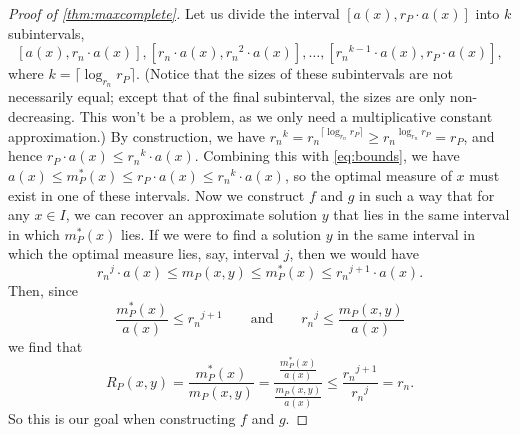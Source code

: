 \documentclass[]{article}
\theoremstyle{plain}
\theoremstyle{definition}
\newcommand{\ceil}[1]{\lceil{#1}\rceil}
\begin{document}
\begin{proof}[Proof of \autoref{thm:maxcomplete}]
  Let us divide the interval $[a(x), r_P \cdot a(x)]$ into $k$ subintervals,
  \begin{displaymath}
    \left[a(x), r_n \cdot a(x)\right], \left[r_n \cdot a(x), {r_n}^2 \cdot a(x)\right], \ldots, \left[{r_n}^{k - 1} \cdot a(x), r_P \cdot a(x)\right],
  \end{displaymath}
  where $k = \ceil{\log_{r_n}{r_P}}$.
  (Notice that the sizes of these subintervals are not necessarily equal; except that of the final subinterval, the sizes are only non-decreasing.
  This won't be a problem, as we only need a multiplicative constant approximation.)
  By construction, we have ${r_n}^k = {r_n}^{\ceil{\log_{r_n}{r_P}}} \geq {r_n}^{\log_{r_n}{r_P}} = r_P$, and hence $r_P \cdot a(x) \leq {r_n}^k \cdot a(x)$.
  Combining this with \autoref{eq:bounds}, we have $a(x) \leq m^*_P(x) \leq r_P \cdot a(x) \leq {r_n}^k \cdot a(x)$, so the optimal measure of $x$ must exist in one of these intervals.
  Now we construct $f$ and $g$ in such a way that for any $x \in I$, we can recover an approximate solution $y$ that lies in the same interval in which $m_P^*(x)$ lies.
  If we were to find a solution $y$ in the same interval in which the optimal measure lies, say, interval $j$, then we would have
  \begin{equation}\label{eq:subinterval}
    {r_n}^j \cdot a(x) \leq m_P(x, y) \leq m^*_P(x) \leq {r_n}^{j + 1} \cdot a(x).
  \end{equation}
  Then, since
  \begin{equation*}
    \frac{m^*_P(x)}{a(x)} \leq {r_n}^{j + 1} \qquad \text{and} \qquad {r_n}^j \leq \frac{m_P(x, y)}{a(x)}
  \end{equation*}
  we find that
  \begin{equation}\label{eq:result}
    R_P(x, y) = \frac{m_P^*(x)}{m_P(x, y)} = \frac{\frac{m^*_P(x)}{a(x)}}{\frac{m_P(x, y)}{a(x)}} \leq \frac{{r_n}^{j + 1}}{{r_n}^j} = r_n.
  \end{equation}
  So this is our goal when constructing $f$ and $g$.


\end{proof}
\end{document}
